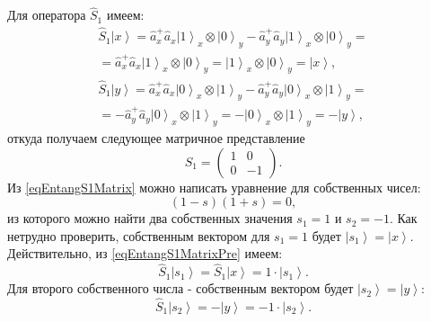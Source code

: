 Для оператора $\hat{S}_1$ имеем:
\begin{eqnarray}
\hat{S}_1 \left|x\right> = \hat{a}_x^{+} \hat{a}_x
\left|1\right>_x\otimes\left|0\right>_y - \hat{a}_y^{+}
\hat{a}_y\left|1\right>_x\otimes\left|0\right>_y =
\nonumber \\
= 
\hat{a}_x^{+} \hat{a}_x
\left|1\right>_x\otimes\left|0\right>_y =
\left|1\right>_x\otimes\left|0\right>_y = \left|x\right>,
\nonumber \\
\hat{S}_1 \left|y\right> = \hat{a}_x^{+} \hat{a}_x
\left|0\right>_x\otimes\left|1\right>_y - \hat{a}_y^{+}
\hat{a}_y\left|0\right>_x\otimes\left|1\right>_y =
\nonumber \\
=
-\hat{a}_y^{+}
\hat{a}_y\left|0\right>_x\otimes\left|1\right>_y
=-\left|0\right>_x\otimes\left|1\right>_y = -\left|y\right>,
\label{eqEntangS1MatrixPre}
\end{eqnarray}
откуда получаем следующее матричное представление
\begin{equation}
\hat{S}_1 = 
\left(
\begin{array}{cc}
1 & 0 \\
0 & -1 
\end{array}
\right).
\label{eqEntangS1Matrix}
\end{equation}
Из \eqref{eqEntangS1Matrix} можно написать уравнение для собственных
чисел:
\[
\left(1-s\right)\left(1 + s\right) = 0,
\]
из которого можно найти два собственных значения $s_1 = 1$ и
$s_2 = -1$. Как нетрудно проверить, собственным вектором для $s_1 = 1$
будет $\left|s_1\right> = \left|x\right>$. Действительно, из \eqref{eqEntangS1MatrixPre}
имеем:
\begin{equation}
\hat{S}_1 \left|s_1\right> = \hat{S}_1 \left|x\right> = 1 \cdot \left|s_1\right>.
\label{eq:part2:pol:stocks_s1_1}
\end{equation}
Для второго собственного числа - собственным вектором будет
$\left|s_2\right> = \left|y\right>$:
\begin{equation}
\hat{S}_1 \left|s_2\right>  = - \left|y\right> = -1 \cdot \left|s_2\right>.
\label{eq:part2:pol:stocks_s1_2}
\end{equation}



